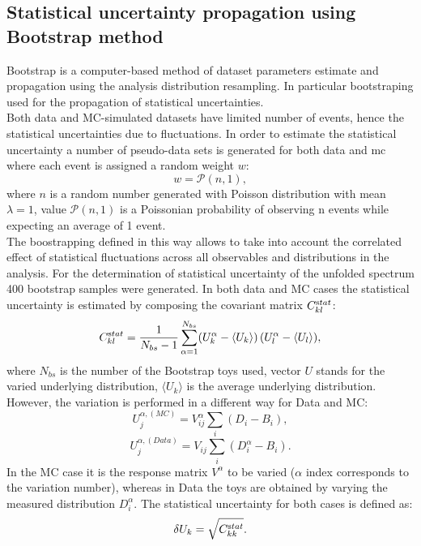 \subsection{Statistical uncertainty propagation using Bootstrap method}
Bootstrap is a computer-based method of dataset parameters estimate and propagation using the analysis distribution resampling. In particular bootstraping used for the propagation of statistical uncertainties. \\
Both data and MC-simulated datasets have limited number of events, hence the statistical uncertainties due to fluctuations. In order to estimate the statistical uncertainty a number of pseudo-data sets is generated for both data and \gls{mc} where each event is assigned a random weight $w$:
\begin{equation}
w = \mathcal{P}(n,1),
\end{equation}
where $n$ is a random number generated with Poisson distribution with mean $\lambda=1$, value $\mathcal{P}(n,1)$ is a Poissonian probability of observing n events while expecting an average of 1 event.\\
The boostrapping defined in this way allows to take into account the correlated effect of statistical fluctuations across all observables and distributions in the analysis. For the determination of statistical uncertainty of the unfolded spectrum 400 bootstrap samples were generated.
In both data and MC cases the statistical uncertainty is estimated by composing the covariant matrix $C_{kl}^{\textrm stat}$:
\begin{equation}
C_{kl}^{\textrm stat} = \frac{1}{N_{bs}-1} \sum_{\alpha=1}^{N_{bs}} (U^\alpha_k-\langle{U}_k\rangle) \, (U^\alpha_l-\langle{U}_l\rangle),
\label{eq:covexpr}
\end{equation}
where $N_{bs}$ is the number of the Bootstrap toys used, vector $U$ stands for the varied underlying distribution, $\langle{U}_k\rangle$ is the average underlying distribution. However, the variation is performed in a different way for Data and MC:
 \begin{equation*}
U_j^{\alpha,(MC)} = V_{ij}^\alpha \sum_{i} (D_i - B_i),
 \end{equation*}
  \begin{equation*}
U_j^{\alpha,(Data)}  = V_{ij} \sum_{i} (D_i^\alpha - B_i).
 \end{equation*}
 In the MC case it is the response matrix $V^\alpha$ to be varied ($\alpha$ index corresponds to the variation number), whereas in Data the toys are obtained by varying the measured distribution $D^\alpha_i$. The statistical uncertainty for both cases is defined as:
 \begin{equation}
 \delta U_k = \sqrt{C_{kk}^{\textrm stat}}.
 \end{equation}
